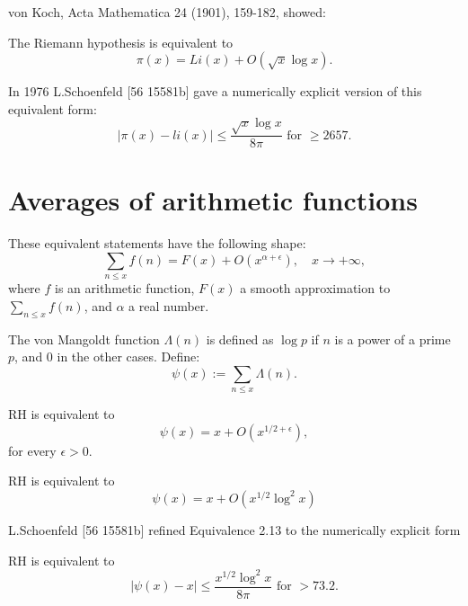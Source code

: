 \documentclass[12pt,letterpaper, reqno]{amsart}
\begin{document}
\begin{problemblock}
von Koch, Acta Mathematica 24 (1901), 159-182, showed:
\begin{rhequivalence}[1.15] 
The Riemann hypothesis is equivalent to
$$
\pi(x) = Li(x) + O( \sqrt{x} \log x).
$$
\end{rhequivalence}

\begin{remark}
In 1976 L.Schoenfeld [56 15581b] gave a numerically explicit version of this equivalent form:
$$
|\pi (x) -li (x)| \leq \frac{\sqrt{x}\log x}{8\pi} \text{ for } \geq 2657.
$$
\end{remark}
\end{problemblock}

\section{Averages of arithmetic functions}
These equivalent statements have the following shape:
$$
\sum_{n \leq x} f(n) = F(x) + O(x^{\alpha + \epsilon}), \quad x \rightarrow +\infty,
$$
where $f$ is an arithmetic function, $F(x)$ a smooth approximation to $\sum_{n \leq x} f(n)$, and $\alpha$ a real number.

\begin{problemblock}
The von Mangoldt function $\Lambda (n)$ is defined
as $\log p$ if $n$ is a power of a prime $p$, and $0$ in the other cases. Define:
$$
\psi(x) := \sum_{n \leq x} \Lambda (n).
$$
\begin{rhequivalence}[2.1]
RH is equivalent to
$$
\psi (x) =x + O(x^{1/2 + \epsilon}),
$$
for every $\epsilon>0$.
\end{rhequivalence}
\end{problemblock}

\begin{problemblock}
\begin{rhequivalence}[2.13]
RH is equivalent to
$$
\psi (x) =x + O(x^{1/2}\log^2 x )
$$
\end{rhequivalence}
\end{problemblock}

\begin{problemblock}
L.Schoenfeld [56 15581b] refined
Equivalence 2.13 to the numerically explicit form
\begin{rhequivalence}[2.17]
RH is equivalent to
$$
|\psi (x) -x| \leq \frac{x^{1/2}\log^2x}{8\pi} \text{ for } > 73.2.
$$
\end{rhequivalence}
\end{problemblock}
\end{document}
